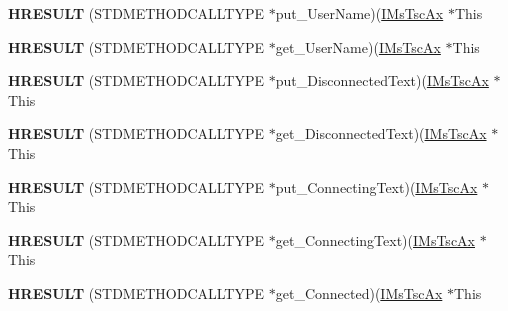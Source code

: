 \begin{DoxyCompactItemize}
{\bfseries H\+R\+E\+S\+U\+LT} (S\+T\+D\+M\+E\+T\+H\+O\+D\+C\+A\+L\+L\+T\+Y\+PE $\ast$put\+\_\+\+User\+Name)(\hyperlink{interface_m_s_t_s_c_lib_1_1_i_ms_tsc_ax}{I\+Ms\+Tsc\+Ax} $\ast$This
\item 
\mbox{\label{struct_m_s_t_s_c_lib_1_1_i_ms_tsc_ax_vtbl_a9c299a6dccd3f2a6f1807828e754cfc8}} 
{\bfseries H\+R\+E\+S\+U\+LT} (S\+T\+D\+M\+E\+T\+H\+O\+D\+C\+A\+L\+L\+T\+Y\+PE $\ast$get\+\_\+\+User\+Name)(\hyperlink{interface_m_s_t_s_c_lib_1_1_i_ms_tsc_ax}{I\+Ms\+Tsc\+Ax} $\ast$This
\item 
\mbox{\label{struct_m_s_t_s_c_lib_1_1_i_ms_tsc_ax_vtbl_a5c287fd9cb6052c971a9adc954fc4e19}} 
{\bfseries H\+R\+E\+S\+U\+LT} (S\+T\+D\+M\+E\+T\+H\+O\+D\+C\+A\+L\+L\+T\+Y\+PE $\ast$put\+\_\+\+Disconnected\+Text)(\hyperlink{interface_m_s_t_s_c_lib_1_1_i_ms_tsc_ax}{I\+Ms\+Tsc\+Ax} $\ast$This
\item 
\mbox{\label{struct_m_s_t_s_c_lib_1_1_i_ms_tsc_ax_vtbl_add2c6be9d36bc44cb2ca65c264391528}} 
{\bfseries H\+R\+E\+S\+U\+LT} (S\+T\+D\+M\+E\+T\+H\+O\+D\+C\+A\+L\+L\+T\+Y\+PE $\ast$get\+\_\+\+Disconnected\+Text)(\hyperlink{interface_m_s_t_s_c_lib_1_1_i_ms_tsc_ax}{I\+Ms\+Tsc\+Ax} $\ast$This
\item 
\mbox{\label{struct_m_s_t_s_c_lib_1_1_i_ms_tsc_ax_vtbl_a74290102f36638f9d13a68395f82ea07}} 
{\bfseries H\+R\+E\+S\+U\+LT} (S\+T\+D\+M\+E\+T\+H\+O\+D\+C\+A\+L\+L\+T\+Y\+PE $\ast$put\+\_\+\+Connecting\+Text)(\hyperlink{interface_m_s_t_s_c_lib_1_1_i_ms_tsc_ax}{I\+Ms\+Tsc\+Ax} $\ast$This
\item 
\mbox{\label{struct_m_s_t_s_c_lib_1_1_i_ms_tsc_ax_vtbl_aafa6d35f1766d43cc006ef11402e3751}} 
{\bfseries H\+R\+E\+S\+U\+LT} (S\+T\+D\+M\+E\+T\+H\+O\+D\+C\+A\+L\+L\+T\+Y\+PE $\ast$get\+\_\+\+Connecting\+Text)(\hyperlink{interface_m_s_t_s_c_lib_1_1_i_ms_tsc_ax}{I\+Ms\+Tsc\+Ax} $\ast$This
\item 
\mbox{\label{struct_m_s_t_s_c_lib_1_1_i_ms_tsc_ax_vtbl_af0112d90244024e34cc2bfa0cf830214}} 
{\bfseries H\+R\+E\+S\+U\+LT} (S\+T\+D\+M\+E\+T\+H\+O\+D\+C\+A\+L\+L\+T\+Y\+PE $\ast$get\+\_\+\+Connected)(\hyperlink{interface_m_s_t_s_c_lib_1_1_i_ms_tsc_ax}{I\+Ms\+Tsc\+Ax} $\ast$This

\end{DoxyCompactItemize}
